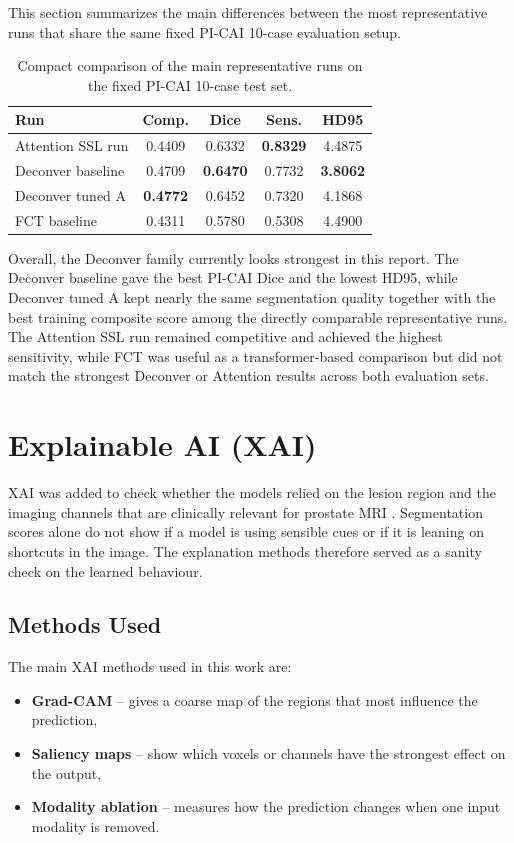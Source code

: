 \documentclass[11pt,a4paper]{article}
\begin{document}
This section summarizes the main differences between the most representative runs that share the same fixed PI-CAI 10-case evaluation setup.

\begin{table}[H]
\centering
\begin{tabular}{>{\raggedright\arraybackslash}p{} c c c c}
\toprule
Run & Comp. & Dice & Sens. & HD95 \\
\midrule
Attention SSL run & 0.4409 & 0.6332 & \textbf{0.8329} & 4.4875 \\
Deconver baseline & 0.4709 & \textbf{0.6470} & 0.7732 & \textbf{3.8062} \\
Deconver tuned A & \textbf{0.4772} & 0.6452 & 0.7320 & 4.1868 \\
FCT baseline & 0.4311 & 0.5780 & 0.5308 & 4.4900 \\
\bottomrule
\end{tabular}
\caption{Compact comparison of the main representative runs on the fixed PI-CAI 10-case test set.}
\end{table}

Overall, the Deconver family currently looks strongest in this report. The Deconver baseline gave the best PI-CAI Dice and the lowest HD95, while Deconver tuned A kept nearly the same segmentation quality together with the best training composite score among the directly comparable representative runs. The Attention SSL run remained competitive and achieved the highest sensitivity, while FCT was useful as a transformer-based comparison but did not match the strongest Deconver or Attention results across both evaluation sets.

\section{Explainable AI (XAI)}

XAI was added to check whether the models relied on the lesion region and the imaging channels that are clinically relevant for prostate MRI \cite{xai_survey}. Segmentation scores alone do not show if a model is using sensible cues or if it is leaning on shortcuts in the image. The explanation methods therefore served as a sanity check on the learned behaviour.

\subsection{Methods Used}

The main XAI methods used in this work are:
\begin{itemize}
    \item \textbf{Grad-CAM} -- gives a coarse map of the regions that most influence the prediction,
    \item \textbf{Saliency maps} -- show which voxels or channels have the strongest effect on the output,
    \item \textbf{Modality ablation} -- measures how the prediction changes when one input modality is removed.
\end{itemize}
\end{document}
